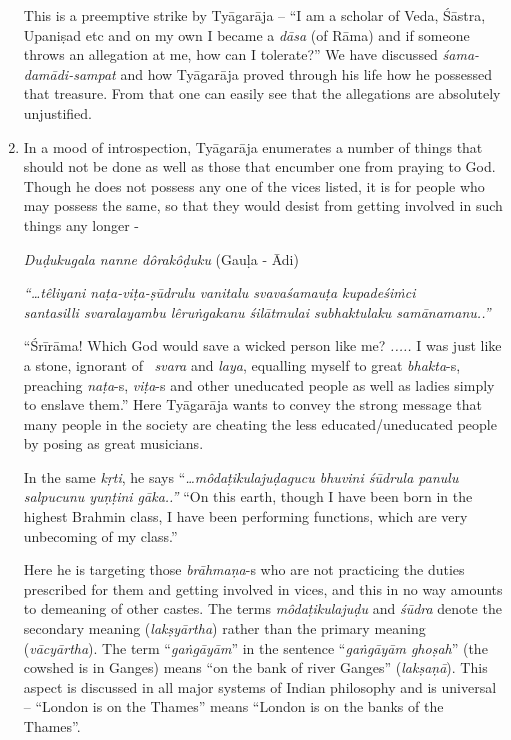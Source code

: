 \begin{enumerate}
 This is a preemptive strike by Tyāgarāja – “I am a scholar of Veda, Śāstra, Upaniṣad etc and on my own I became a \textit{dāsa} (of Rāma) and if someone throws an allegation at me, how can I tolerate?” We have discussed \textit{śama-damādi-sampat} and how Tyāgarāja proved through his life how he possessed that treasure. From that one can easily see that the allegations are absolutely unjustified.

 \item 
 In a mood of introspection, Tyāgarāja enumerates a number of things that should not be done as well as those that encumber one from praying to God. Though he does not possess any one of the vices listed, it is for people who may possess the same, so that they would desist from getting involved in such things any longer -  

 \textit{Duḍukugala nanne dôrakôḍuku} (Gauḷa - Ādi)

\begin{myquote}
\textit{“…têliyani naṭa-viṭa-ṣūdrulu vanitalu svavaśamauṭa kupadeśiṁci}\\ \textit{santasilli svaralayambu lêruṅgakanu śilātmulai subhaktulaku samānamanu..”}
\end{myquote}

 “Śrīrāma! Which God would save a wicked person like me? \textit{.....} I was just like a stone, ignorant of  \textit{svara} and \textit{laya}, equalling myself to great \textit{bhakta}-s, preaching \textit{naṭa}-s, \textit{viṭa}-s and other uneducated people as well as ladies simply to enslave them.” Here Tyāgarāja wants to convey the strong message that many people in the society are cheating the less educated/uneducated people by posing as great musicians.

 In the same \textit{kṛti}, he says “\textit{…môdaṭikulajuḍagucu bhuvini śūdrula panulu salpucunu yuṇṭini gāka..”} “On this earth, though I have been born in the highest Brahmin class, I have been performing functions, which are very unbecoming of my class.”

 Here he is targeting those \textit{brāhmaṇa}-s who are not practicing the duties prescribed for them and getting involved in vices, and this in no way amounts to demeaning of other castes. The terms \textit{môdaṭikulajuḍu} and \textit{śūdra} denote the secondary meaning (\textit{lakṣyārtha}) rather than the primary meaning (\textit{vācyārtha}). The term “\textit{gaṅgāyām}” in the sentence “\textit{gaṅgāyām ghoṣah}” (the cowshed is in Ganges) means “on the bank of river Ganges” (\textit{lakṣaṇā}). This aspect is discussed in all major systems of Indian philosophy and is universal – “London is on the Thames” means “London is on the banks of the Thames”.


\end{enumerate}
